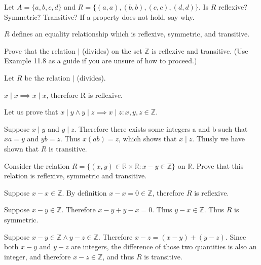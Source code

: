 \documentclass{article}
\begin{document}
\begin{exercise}{}{}{Let $A=\{a, b, c, d\}$ and $R=\{(a, a),(b, b),(c,
			c),(d, d)\}$. Is $R$ reflexive? Symmetric? Transitive? If a property does
		not hold, say why.}
	\tcblower
	\begin{alist}
		\item $R$ defines an equality relationship which is reflexive, symmetric, and transitive.
	\end{alist}
\end{exercise}{}{}

\begin{exercise}{}{}{Prove that the relation $\mid$ (divides) on the set
		$\mathbb{Z}$ is reflexive and transitive. (Use Example 11.8 as a guide if
		you are unsure of how to proceed.)}
	\tcblower
	\begin{alist}
		\item Let $R$ be the relation $\mid$ (divides).
		\item $x \mid x \implies x \mid x$, therefore R is reflexive.
		\item Let us prove that $x \mid y \land y \mid z \implies x \mid z: x,y,z \in\mathbb{Z}$.
		\item Suppose $x\mid y$ and $y\mid z$. Therefore there exists some integers a
		and b such that $xa=y$ and $yb=z$. Thus $x(ab)=z$, which shows that $x\mid
			z$. Thusly we have shown that $R$ is transitive.
	\end{alist}
\end{exercise}{}{}

\begin{exercise}{}{}{Consider the relation $R=\{(x, y) \in \mathbb{R} \times
			\mathbb{R}: x-y \in \mathbb{Z}\}$ on $\mathbb{R}$. Prove that this relation
		is reflexive, symmetric and transitive.}
	\tcblower
	\begin{alist}
		\item Suppose $x - x \in \mathbb{Z}$.  By definition $x-x=0 \in \mathbb{Z}$,
		therefore $R$ is reflexive.
		\item Suppose $x - y \in \mathbb{Z}$. Therefore $x-y + y-x = 0$. Thus
		$y-x\in\mathbb{Z}$. Thus $R$ is symmetric.
		\item Suppose $x - y \in \mathbb{Z} \land y - z\in\mathbb{Z}$. Therefore $x-z =
			(x-y) + (y-z)$. Since both $x-y$ and $y-z$ are integers, the difference of those
		two quantities is also an integer, and therefore $x-z\in\mathbb{Z}$, and
		thus $R$ is transitive.
	\end{alist}
\end{exercise}{}{}
\end{document}
